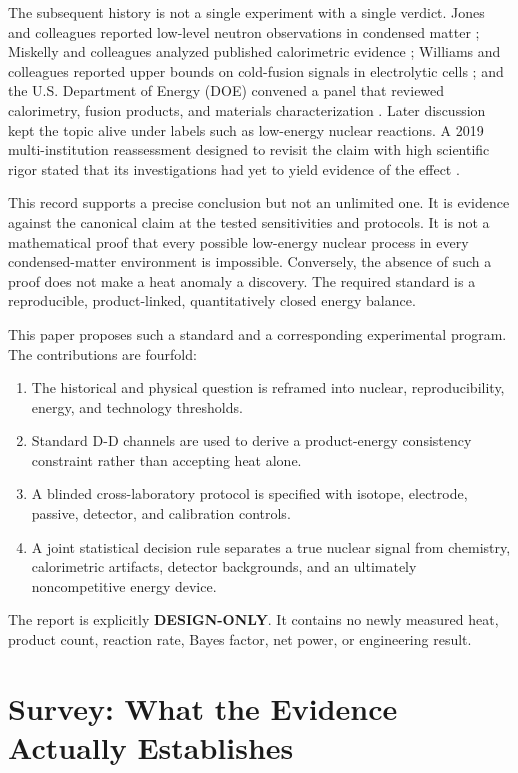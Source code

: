 \documentclass[conference]{IEEEtran}
\begin{document}
The subsequent history is not a single experiment with a single verdict. Jones and colleagues reported low-level neutron observations in condensed matter \cite{jones1989}; Miskelly and colleagues analyzed published calorimetric evidence \cite{miskelly1989}; Williams and colleagues reported upper bounds on cold-fusion signals in electrolytic cells \cite{williams1989}; and the U.S. Department of Energy (DOE) convened a panel that reviewed calorimetry, fusion products, and materials characterization \cite{doe1989}. Later discussion kept the topic alive under labels such as low-energy nuclear reactions. A 2019 multi-institution reassessment designed to revisit the claim with high scientific rigor stated that its investigations had yet to yield evidence of the effect \cite{berlinguette2019}.

This record supports a precise conclusion but not an unlimited one. It is evidence against the canonical claim at the tested sensitivities and protocols. It is not a mathematical proof that every possible low-energy nuclear process in every condensed-matter environment is impossible. Conversely, the absence of such a proof does not make a heat anomaly a discovery. The required standard is a reproducible, product-linked, quantitatively closed energy balance.

This paper proposes such a standard and a corresponding experimental program. The contributions are fourfold:
\begin{enumerate}
\item The historical and physical question is reframed into nuclear, reproducibility, energy, and technology thresholds.
\item Standard D-D channels are used to derive a product-energy consistency constraint rather than accepting heat alone.
\item A blinded cross-laboratory protocol is specified with isotope, electrode, passive, detector, and calibration controls.
\item A joint statistical decision rule separates a true nuclear signal from chemistry, calorimetric artifacts, detector backgrounds, and an ultimately noncompetitive energy device.
\end{enumerate}

The report is explicitly \textbf{DESIGN-ONLY}. It contains no newly measured heat, product count, reaction rate, Bayes factor, net power, or engineering result.

\section{Survey: What the Evidence Actually Establishes}
\label{sec:survey}
\end{document}
